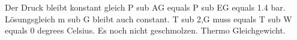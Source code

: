 Der Druck bleibt konstant gleich P sub AG equals P sub EG equals 1.4 bar.  
Lösungsgleich m sub G bleibt auch constant.  
T sub 2,G muss equals T sub W equals 0 degrees Celsius.  
Es noch nicht geschmolzen.  
Thermo Gleichgewicht.